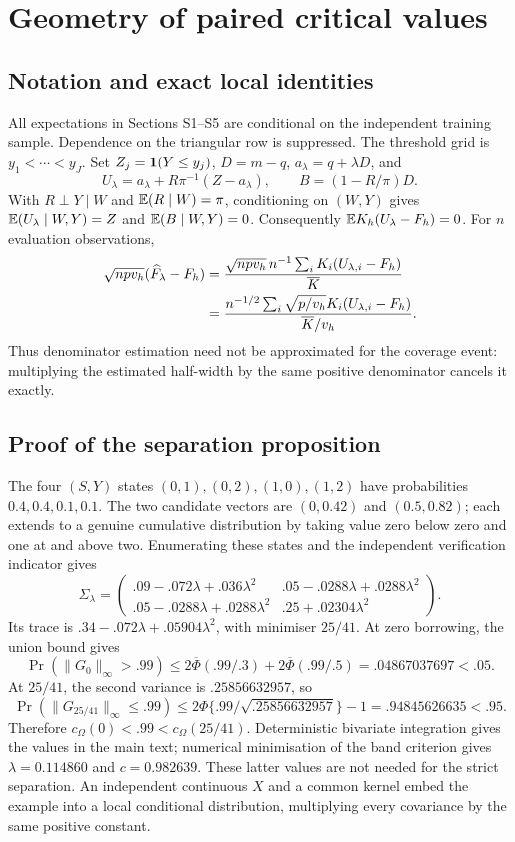 \section{Geometry of paired critical values}
\subsection{Notation and exact local identities}
All expectations in Sections S1--S5 are conditional on the independent training sample. Dependence on the triangular row is suppressed. The threshold grid is $y_1<\cdots<y_J$. Set $Z_j=\mathbf 1(Y\leq y_j)$, $D=m-q$, $a_\lambda=q+\lambda D$, and
\[
 U_\lambda=a_\lambda+R\pi^{-1}(Z-a_\lambda),\qquad
 B=(1-R/\pi)D.
\]
With $R\perp Y\mid W$ and $\mathbb E(R\mid W)=\pi$, conditioning on $(W,Y)$ gives
$\mathbb E(U_\lambda\mid W,Y)=Z$ and $\mathbb E(B\mid W,Y)=0$.
Consequently $\mathbb E K_h(U_\lambda-F_h)=0$. For $n$ evaluation observations,
\begin{align}
 \sqrt{npv_h}(\widehat F_\lambda-F_h)
 &=\frac{\sqrt{npv_h}\,n^{-1}\sum_i K_i(U_{\lambda,i}-F_h)}{\overline K}\notag\\
 &=\frac{n^{-1/2}\sum_i\sqrt{p/v_h}K_i(U_{\lambda,i}-F_h)}{\overline K/v_h}.
\end{align}
Thus denominator estimation need not be approximated for the coverage event: multiplying the estimated half-width by the same positive denominator cancels it exactly.

\subsection{Proof of the separation proposition}
The four $(S,Y)$ states $(0,1),(0,2),(1,0),(1,2)$ have probabilities $0.4,0.4,0.1,0.1$. The two candidate vectors are $(0,0.42)$ and $(0.5,0.82)$; each extends to a genuine cumulative distribution by taking value zero below zero and one at and above two. Enumerating these states and the independent verification indicator gives
\begin{equation}\label{eq:s-separation}
 \Sigma_\lambda=
 \begin{pmatrix}
 .09-.072\lambda+.036\lambda^2&.05-.0288\lambda+.0288\lambda^2\\
 .05-.0288\lambda+.0288\lambda^2&.25+.02304\lambda^2
 \end{pmatrix}.
\end{equation}
Its trace is $.34-.072\lambda+.05904\lambda^2$, with minimiser $25/41$. At zero borrowing, the union bound gives
\[
 \Pr(\|G_0\|_\infty>.99)
 \leq2\overline\Phi(.99/.3)+2\overline\Phi(.99/.5)
 =.04867037697<.05.
\]
At $25/41$, the second variance is $.25856632957$, so
\[
 \Pr(\|G_{25/41}\|_\infty\leq.99)
 \leq2\Phi\{.99/\sqrt{.25856632957}\}-1
 =.94845626635<.95.
\]
Therefore $c_\Omega(0)<.99<c_\Omega(25/41)$. Deterministic bivariate integration gives the values in the main text; numerical minimisation of the band criterion gives $\lambda=0.114860$ and $c=0.982639$. These latter values are not needed for the strict separation. An independent continuous $X$ and a common kernel embed the example into a local conditional distribution, multiplying every covariance by the same positive constant.

